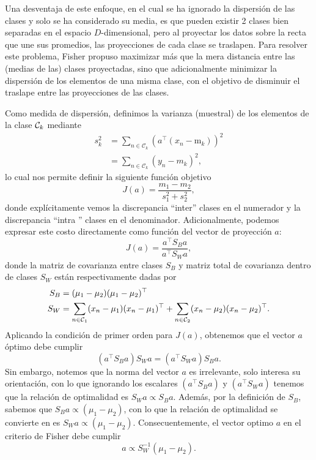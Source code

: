 Una desventaja de este enfoque, en el cual se ha ignorado la dispersión de las clases y solo se ha considerado su media, es que pueden existir 2 clases bien separadas en el espacio $D$-dimensional, pero al proyectar los datos sobre la recta que une sus promedios, las proyecciones de cada clase se traslapen. Para resolver este problema, Fisher propuso maximizar más que la mera distancia entre las (medias de las) clases proyectadas, sino que adicionalmente minimizar la dispersión de los elementos de una misma clase, con el objetivo de disminuir el traslape entre las proyecciones de las clases. 

Como medida de dispersión, definimos la varianza (muestral) de los elementos de la clase ${\mathcal C}_k$ mediante
\begin{align}
	s_k^2 &= \sum_{n\in \mathcal{C}_k}(a^\top(x_n-\text{m}_k))^2\\
	&= \sum_{n\in \mathcal{C}_k}(y_n-m_k)^2,
\end{align}
lo cual nos permite definir la siguiente función objetivo
\begin{equation}
J(a) = \frac{m_1-m_2}{s_1^2+s_2 ^2},
\end{equation}
donde explícitamente vemos la discrepancia ``inter'' clases en el numerador y la discrepancia  ``intra '' clases en el denominador. Adicionalmente, podemos expresar este costo directamente como función del vector de proyección $a$:
\begin{equation}
	J(a) = \frac{a^\top S_B a}{a^\top S_Wa},
\end{equation}
donde la matriz de covarianza entre clases $S_B$ y matriz total de covarianza dentro de clases $S_W$ están respectivamente dadas por
\begin{align}
	S_B &= (\mu_1-\mu_2)(\mu_1-\mu_2)^\top\\
	S_W &= \sum_{n\in {\mathcal C}_1}(x_n-\mu_1)(x_n-\mu_1)^\top +
	\sum_{n\in {\mathcal C}_2}(x_n-\mu_2)(x_n-\mu_2)^\top. 
\end{align}
Aplicando la condición de primer orden para $J(a)$, obtenemos que el vector $a$ óptimo debe cumplir
\begin{equation}
	(a^\top S_B a)S_W a = (a^\top S_W a)S_B a.	
\end{equation}
Sin embargo, notemos que la norma del vector  $a$ es irrelevante, solo interesa su orientación, con lo que  ignorando los escalares $(a^\top S_B a)$ y $(a^\top S_W a)$ tenemos que la relación de optimalidad es $S_W a \propto S_B a$. Además, por la definición de $S_B$, sabemos que $S_B a\propto(\mu_1-\mu_2)$, con lo que la relación de optimalidad se convierte en es $S_W a \propto (\mu_1-\mu_2)$. Consecuentemente, el vector optimo $a$ en el  criterio de Fisher debe cumplir
\begin{equation}
	a \propto S_W^{-1}(\mu_1-\mu_2).
\end{equation}

